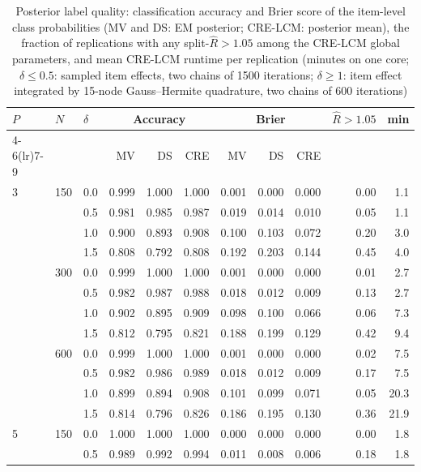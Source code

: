 \begin{table}[htbp]
\centering
\scriptsize
\setlength{\tabcolsep}{4pt}
\caption{Posterior label quality: classification accuracy and Brier score of the item-level class probabilities (MV and DS: EM posterior; CRE-LCM: posterior mean), the fraction of replications with any split-$\widehat{R} > 1.05$ among the CRE-LCM global parameters, and mean CRE-LCM runtime per replication (minutes on one core; $\delta \le 0.5$: sampled item effects, two chains of 1500 iterations; $\delta \ge 1$: item effect integrated by 15-node Gauss--Hermite quadrature, two chains of 600 iterations)}\label{tab:labels}
\begin{tabular}{lllrrrrrrrr}
\toprule
$P$ & $N$ & $\delta$ & \multicolumn{3}{c}{Accuracy} & \multicolumn{3}{c}{Brier} & $\widehat{R} > 1.05$ & min \\
\cmidrule(lr){4-6}\cmidrule(lr){7-9}
 & & & MV & DS & CRE & MV & DS & CRE & & \\
\midrule
3 & 150 & 0.0 & 0.999 & 1.000 & 1.000 & 0.001 & 0.000 & 0.000 & 0.00 & 1.1 \\
 &  & 0.5 & 0.981 & 0.985 & 0.987 & 0.019 & 0.014 & 0.010 & 0.05 & 1.1 \\
 &  & 1.0 & 0.900 & 0.893 & 0.908 & 0.100 & 0.103 & 0.072 & 0.20 & 3.0 \\
 &  & 1.5 & 0.808 & 0.792 & 0.808 & 0.192 & 0.203 & 0.144 & 0.45 & 4.0 \\
 & 300 & 0.0 & 0.999 & 1.000 & 1.000 & 0.001 & 0.000 & 0.000 & 0.01 & 2.7 \\
 &  & 0.5 & 0.982 & 0.987 & 0.988 & 0.018 & 0.012 & 0.009 & 0.13 & 2.7 \\
 &  & 1.0 & 0.902 & 0.895 & 0.909 & 0.098 & 0.100 & 0.066 & 0.06 & 7.3 \\
 &  & 1.5 & 0.812 & 0.795 & 0.821 & 0.188 & 0.199 & 0.129 & 0.42 & 9.4 \\
 & 600 & 0.0 & 0.999 & 1.000 & 1.000 & 0.001 & 0.000 & 0.000 & 0.02 & 7.5 \\
 &  & 0.5 & 0.982 & 0.986 & 0.989 & 0.018 & 0.012 & 0.009 & 0.17 & 7.5 \\
 &  & 1.0 & 0.899 & 0.894 & 0.908 & 0.101 & 0.099 & 0.071 & 0.05 & 20.3 \\
 &  & 1.5 & 0.814 & 0.796 & 0.826 & 0.186 & 0.195 & 0.130 & 0.36 & 21.9 \\
5 & 150 & 0.0 & 1.000 & 1.000 & 1.000 & 0.000 & 0.000 & 0.000 & 0.00 & 1.8 \\
 &  & 0.5 & 0.989 & 0.992 & 0.994 & 0.011 & 0.008 & 0.006 & 0.18 & 1.8 \\

\end{tabular}
\end{table}
